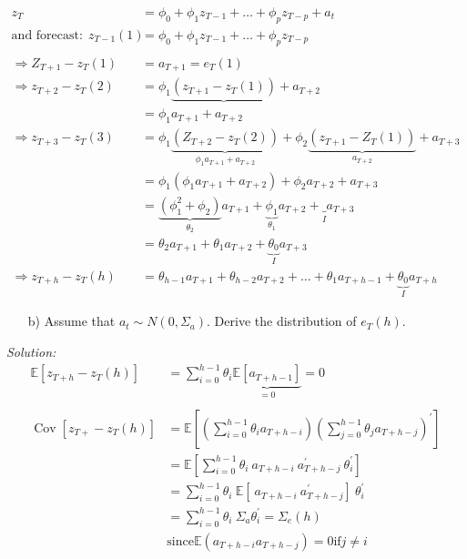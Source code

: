 \documentclass[12pt,a4paper]{article}
\newcommand{\Cov}{\operatorname{Cov}}
\begin{document}
\begin{align*}
  z_T  & =  \phi_0 + \phi_1 z_{T-1} + \ldots  + \phi_p z_{T-p} + a_t \\
  \text{and forecast:} \ \ z_{T-1} (1) & = \phi_0  +\phi_1 z_{T-1} + \ldots  + \phi_p z_{T - p}\\
  \\
  \Rightarrow Z_{T + 1} - z_T (1) & = a_{T +1} = e_T (1) \\
  \Rightarrow z_{T + 2} - z_T (2) & = \phi_1 \underbrace{\left( z_{T + 1} - z_T (1) \right)} + a_{T + 2}\\
  & = \phi_1 a_{T+1} + a_{T+2}\\
  \Rightarrow z_{T + 3} - z_T (3) & = \phi_1 \underbrace{\left( Z_{T + 2} - z_{T} (2) \right)}_{\phi_1 a_{T + 1} + a_{T + 2}} + \phi_2 \underbrace{\left( z_{T +1} - Z_T (1) \right)}_{a_{T + 2}} + a_{T + 3} \\
  & = \phi_1 \left( \phi_1 a_{T + 1} + a_{T + 2} \right) + \phi_2 a_{T + 2} + a_{T + 3}\\
  & = \underbrace{\left( \phi_1^2 + \phi_2 \right)}_{\theta_2} a_{T + 1} + \underbrace{\phi_1}_{\theta_1} a_{T + 2} + \underbrace{ \ }_{I} a_{T + 3}\\
  & = \theta_2 a_{T + 1} + \theta_1 a_{T + 2} + \underbrace{\theta_0}_{I} a_{T + 3}\\
  \Rightarrow z_{T + h} - z_T (h) & = \theta_{h - 1} a_{T + 1} + \theta_{h - 2} a_{T + 2} + \ldots + \theta_{1} a_{T + h - 1} + \underbrace{\theta_0}_{I} a_{T + h}
\end{align*}

\begin{itemize}
  \item[b)] Assume that $a_t \sim N \left( 0, \Sigma_a \right)$. Derive the distribution of $e_T (h)$.   
\end{itemize}

\emph{Solution:} \begin{align*}
  \mathbb{E} \left[ z_{T +h}  - z_T (h) \right] & = \sum_{i = 0}^{h-1} \theta_i  \underbrace{\mathbb{E} \left[ a_{T + h - 1}\right]}_{= 0} = 0\\
  \\
  \Cov \left[ z_{T+} - z_T (h) \right]  & = \mathbb{E} \left[ \left( \sum_{i = 0}^{h-1} \theta_i a_{T + h - i} \right) \left( \sum_{j = 0}^{h-1} \theta_j a_{T + h - j} \right)^{'} \right]\\
   & = \mathbb{E} \left[ \sum_{i = 0}^{h-1} \theta_i \ a_{T + h - i} \ a_{T + h - j}^{'} \ \theta_i^{'} \right]\\
   & = \sum_{i = 0}^{h-1} \theta_i \ \mathbb{E} \left[\ a_{T + h - i} \ a_{T + h - j}^{'} \right] \ \theta_i^{'} \\
   & = \sum_{i = 0}^{h-1} \theta_i \ \Sigma_a  \theta_i^{'}  = \Sigma_e (h) \\
   & \text{since} \mathbb{E} \left( a_{T + h - i} a_{T + h - j} \right) = 0 \text{if} j \neq i 
\end{align*}
\end{document}
